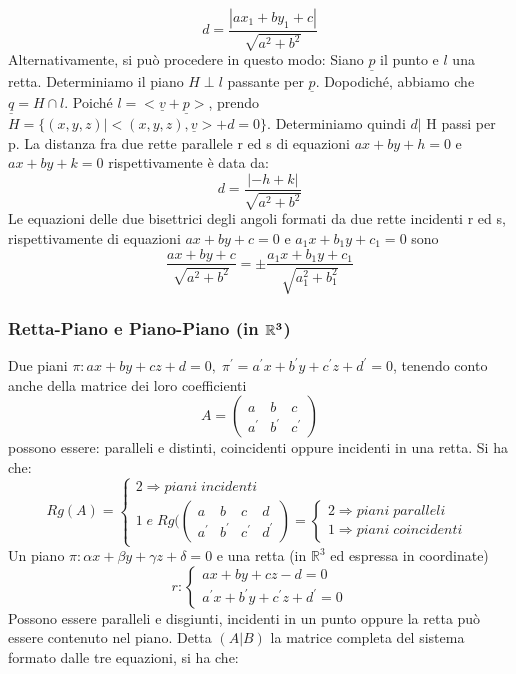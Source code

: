 \documentclass[12pt]{article}
\newenvironment{para}{\begin{adjustwidth}{13mm}{}}{\end{adjustwidth}}
\begin{document}
\begin{para}
$$d=\frac{|ax_1+by_1+c|}{\sqrt{a^2+b^2}}$$
Alternativamente, si può procedere in questo modo: Siano $\underline{p}$ il punto e $l$ una retta. Determiniamo il piano $H \perp l$ passante per $\underline{p}$. Dopodiché, abbiamo che $\underline{q} = H \cap l$. Poiché $l = <\underline{v}+\underline{p}>$, prendo $H = \{(x,y,z)|<(x,y,z),\underline{v}> +d = 0\}$. Determiniamo quindi $d|$ H passi per p.\newline
La distanza fra due rette parallele r ed s di equazioni $ax+by+h = 0$ e $ax+by+k = 0$ rispettivamente è data da: $$d=\frac{|-h+k|}{\sqrt{a^2+b^2}}$$
Le equazioni delle due bisettrici degli angoli formati da due rette incidenti r ed s, rispettivamente di equazioni $ax+by+c = 0$ e $a_1x+b_1y+c_1=0$ sono $$\frac{ax+by+c}{\sqrt{a^2+b^2}}=\pm \frac{a_1x+b_1y+c_1}{\sqrt{a_1^2+b_1^2}}$$
\subsubsection{Retta-Piano e Piano-Piano (in $\bold{\mathbb{R}^3}$)}
Due piani $\pi: ax+by+cz+d = 0, \; \pi^{'}=a^{'}x+b^{'}y+c^{'}z+d^{'}=0$, tenendo conto anche della matrice dei loro coefficienti 
$$A = \begin{pmatrix}
    a & b & c \\
    a^{'} & b^{'} & c^{'}
\end{pmatrix}$$
possono essere: paralleli e distinti, coincidenti oppure incidenti in una retta. Si ha che:
$$Rg(A) = \begin{cases}
    2 \Rightarrow piani \; incidenti \\
    1 \; e \; Rg(\begin{pmatrix}
        a & b & c & d \\
        a^{'} & b^{'} & c^{'} & d^{'}
    \end{pmatrix} = \begin{cases}
        2 \Rightarrow piani \; paralleli \\
        1 \Rightarrow piani \; coincidenti
    \end{cases}
\end{cases}$$
Un piano $\pi: \alpha x + \beta y + \gamma z + \delta = 0$ e una retta (in $\mathbb{R}^3$ ed espressa in coordinate)\newline $$r:\begin{cases}
    ax+by+cz-d = 0 \\
    a^{'}x+b^{'}y+c^{'}z+d^{'} = 0
\end{cases}$$
\newline Possono essere paralleli e disgiunti, incidenti in un punto oppure la retta può essere contenuto nel piano. Detta $(A|B)$ la matrice completa del sistema formato dalle tre equazioni, si ha che:

\end{para}
\end{document}
